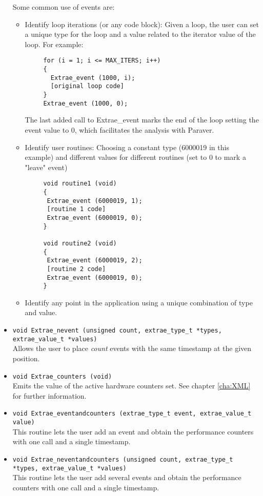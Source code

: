 \begin{itemize}
 Some common use of events are:
  \begin{itemize}
   \item Identify loop iterations (or any code block): Given a loop, the user can set a unique type for the loop and a value related to the iterator value of the loop. For example:
    \begin{verbatim}
     for (i = 1; i <= MAX_ITERS; i++)
     {
       Extrae_event (1000, i);
       [original loop code]
     }
     Extrae_event (1000, 0);
    \end{verbatim}
   The last added call to Extrae\_event marks the end of the loop setting the event value to 0, which facilitates the analysis with Paraver.
   \item Identify user routines: Choosing a constant type (6000019 in this example) and different values for different routines (set to 0 to mark a "leave" event) 
    \begin{verbatim}
     void routine1 (void)
     {
      Extrae_event (6000019, 1);
      [routine 1 code]
      Extrae_event (6000019, 0);
     }

     void routine2 (void)
     {
      Extrae_event (6000019, 2);
      [routine 2 code]
      Extrae_event (6000019, 0);
     }
   \end{verbatim}
   \item Identify any point in the application using a unique combination of type and value.
  \end{itemize}

 \item {\tt void Extrae\_nevent (unsigned count, extrae\_type\_t *types, extrae\_value\_t *values)}\\
  Allows the user to place {\em count} events with the same timestamp at the given position.

 \item {\tt void Extrae\_counters (void)}\\
  Emits the value of the active hardware counters set. See chapter \ref{cha:XML} for further information.

 \item {\tt void Extrae\_eventandcounters (extrae\_type\_t event, extrae\_value\_t value)}\\
  This routine lets the user add an event and obtain the performance counters with one call and a single timestamp.

 \item {\tt void Extrae\_neventandcounters (unsigned count, extrae\_type\_t *types, extrae\_value\_t *values)}\\
  This routine lets the user add several events and obtain the performance counters with one call and a single timestamp.


\end{itemize}
